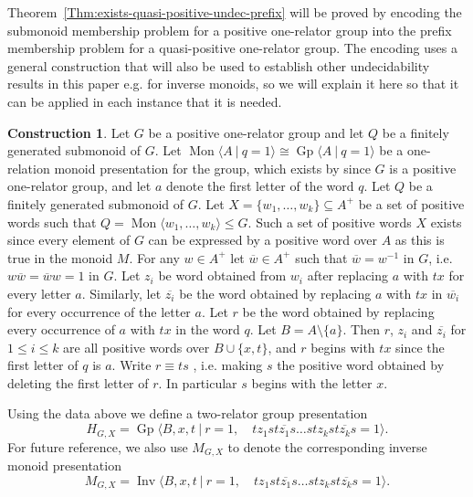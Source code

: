 \documentclass{amsart}
\newcommand{\Mpres}[2]{\operatorname{Mon}\bigl\langle #1\:|\:#2 \bigr\rangle}
\newcommand{\Mgen}[1]{\operatorname{Mon}\bigl\langle #1 \bigr\rangle}
\newcommand{\Gpres}[2]{\operatorname{Gp}\bigl\langle #1\:|\:#2 \bigr\rangle}
\newcommand{\Ipres}[2]{\operatorname{Inv}\bigl\langle #1\:|\:#2 \bigr\rangle}
\theoremstyle{plain}
\theoremstyle{definition}
\newtheorem{construction}[theorem]{Construction}
\begin{document}
Theorem~\ref{Thm:exists-quasi-positive-undec-prefix} 
will be proved by encoding the submonoid membership problem for a positive one-relator group into the prefix membership problem for a quasi-positive one-relator group. The encoding uses a general construction that will also be used to establish other undecidability results in this paper e.g. for inverse monoids, so we will explain it here so that it can be applied in each instance that it is needed.  

\begin{construction}\label{construction_encoding}
Let $G$ be a positive one-relator group and let $Q$ be a finitely generated submonoid of $G$.     
Let $\Mpres{A}{q=1} \cong \Gpres{A}{q=1}$ be a one-relation monoid presentation for the group, which exists by \cite{Perrin1984} since $G$ is a positive one-relator group, and let $a$ denote the first letter of the word $q$. Let $Q$ be a finitely generated submonoid of $G$.  Let $X = \{w_1, \ldots, w_k \} \subseteq A^+$ be a set of positive words such that $Q = \Mgen{w_1, \ldots, w_k} \leq G$.  Such a set of positive words $X$ exists since  every element of $G$ can be expressed by a positive word over $A$ as this is true in the monoid $M$. For any $w \in A^+$ let $\overline{w} \in A^+$ such that $\overline{w} = w^{-1}$ in $G$, i.e. $w \overline{w} = \overline{w} w = 1$ in $G$.     Let $z_i$ be word obtained from $w_i$ after replacing $a$ with $tx$ for every letter $a$.  Similarly, let $\overline{z_i}$ be the word obtained by replacing $a$ with $tx$ in $\overline{w_i}$ for every occurrence of the letter $a$.  Let $r$ be the word obtained by replacing every occurrence of $a$ with $tx$ in the word $q$. Let $B = A \setminus \{a\}$. Then $r$, $z_i$ and $\overline{z_i}$ for $1 \leq i \leq k$ are all positive words over $B \cup \{x,t\}$, and $r$ begins with $tx$ since the first letter of $q$ is $a$. 
Write $r \equiv ts$ , i.e. making $s$ the positive word obtained by deleting the first letter of $r$. In particular $s$ begins with the letter $x$.                       

Using the data above we define a two-relator group presentation 
\[
H_{G,X} = \Gpres{B,x,t}{
r = 1, \quad 
t z_1 s t\overline{z_1} s  \ldots  s t z_k s t\overline{z_k} s = 1
}.
\]
For future reference, we also use $M_{G,X}$ to denote the corresponding inverse monoid presentation  
\[
M_{G,X} = \Ipres{B,x,t}{
r = 1, \quad 
t z_1 s t\overline{z_1} s  \ldots  s t z_k s t\overline{z_k} s = 1
}.
\]
\end{construction}
\end{document}
